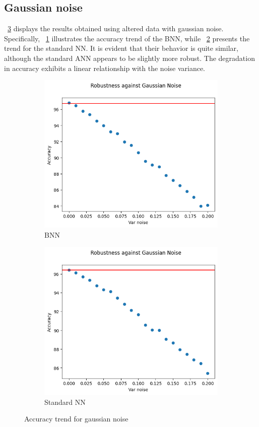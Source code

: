 \subsection{Gaussian noise}

\Fig~\ref{fig:acc_gn_wu} displays the results obtained using altered data with gaussian noise. Specifically, \Fig~\ref{fig:gn_acc_wu_bnn} illustrates the accuracy trend of the BNN, while \Fig~\ref{fig:gaus_noise_ann} presents the trend for the standard NN. It is evident that their behavior is quite similar, although the standard ANN appears to be slightly more robust. The degradation in accuracy exhibits a linear relationship with the noise variance.

\begin{figure}[h]
	\centering
	\begin{subfigure}{.5\textwidth}
		\centering
		\includegraphics[width=0.9\linewidth]{ImageFiles/EvalBNN/GN/WU/acc}
		\caption{BNN}
		\label{fig:gn_acc_wu_bnn}
	\end{subfigure}%
	\begin{subfigure}{.5\textwidth}
		\centering
		\includegraphics[width=0.9\linewidth]{ImageFiles/EvalANN/gaus_noise_ann}
		\caption{Standard NN}
		\label{fig:gaus_noise_ann}
	\end{subfigure}
	\caption{Accuracy trend for gaussian noise}
	\label{fig:acc_gn_wu}
\end{figure}

